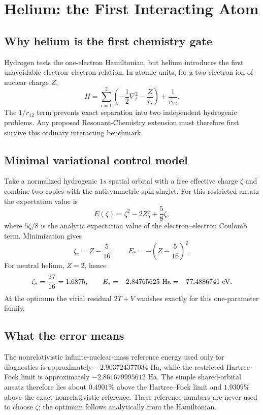 \chapter{Helium: the First Interacting Atom}

\section{Why helium is the first chemistry gate}
Hydrogen tests the one-electron Hamiltonian, but helium introduces the first unavoidable electron--electron relation. In atomic units, for a two-electron ion of nuclear charge $Z$,
\begin{equation}
H=\sum_{i=1}^{2}\left(-\frac12\nabla_i^2-\frac{Z}{r_i}\right)+\frac{1}{r_{12}}.
\end{equation}
The $1/r_{12}$ term prevents exact separation into two independent hydrogenic problems. Any proposed Resonant-Chemistry extension must therefore first survive this ordinary interacting benchmark.

\section{Minimal variational control model}
Take a normalized hydrogenic $1s$ spatial orbital with a free effective charge $\zeta$ and combine two copies with the antisymmetric spin singlet. For this restricted ansatz the expectation value is
\begin{equation}
E(\zeta)=\zeta^2-2Z\zeta+\frac{5}{8}\zeta,
\end{equation}
where $5\zeta/8$ is the analytic expectation value of the electron--electron Coulomb term. Minimization gives
\begin{equation}
\zeta_*=Z-\frac{5}{16},\qquad E_*=-\left(Z-\frac{5}{16}\right)^2.
\end{equation}
For neutral helium, $Z=2$, hence
\begin{equation}
\zeta_*=\frac{27}{16}=1.6875,
\qquad E_*=-2.84765625\ {\rm Ha}=-77.4886741\ {\rm eV}.
\end{equation}
At the optimum the virial residual $2T+V$ vanishes exactly for this one-parameter family.

\section{What the error means}
The nonrelativistic infinite-nuclear-mass reference energy used only for diagnostics is approximately $-2.903724377034$ Ha, while the restricted Hartree--Fock limit is approximately $-2.861679995612$ Ha. The simple shared-orbital ansatz therefore lies about $0.4901\%$ above the Hartree--Fock limit and $1.9309\%$ above the exact nonrelativistic reference. These reference numbers are never used to choose $\zeta$; the optimum follows analytically from the Hamiltonian.

